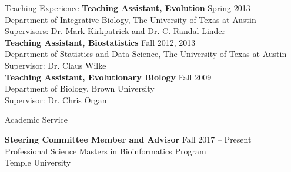 \documentclass{resume} %
\begin{document}
\begin{rSection}{Teaching Experience}
\textbf{Teaching Assistant, Evolution} \hfill Spring 2013 \\ Department of Integrative Biology, The University of Texas at Austin \\
Supervisors: Dr. Mark Kirkpatrick and Dr. C. Randal Linder \\

\textbf{Teaching Assistant, Biostatistics} \hfill Fall 2012, 2013 \\ Department of Statistics and Data Science, The University of Texas at Austin \\
Supervisor: Dr. Claus Wilke \\

\textbf{Teaching Assistant, Evolutionary Biology} \hfill Fall 2009  \\ Department of Biology, Brown University \\
Supervisor: Dr. Chris Organ

\end{rSection}
\vspace*{0.5cm}

\vspace*{0.5cm}
\begin{rSection}{Academic Service}
\vspace*{0.25cm}

\textbf{Steering Committee Member and Advisor} \hfill Fall 2017 -- Present \\ Professional Science Masters in Bioinformatics Program \\ Temple University 


\end{rSection}
\vspace*{0.5cm}
\end{document}
